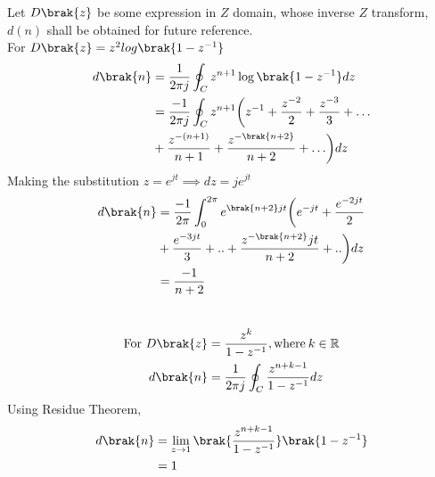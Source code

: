 Let $D\brak{z}$ be some expression in $Z$ domain, whose inverse $Z$ transform, $d(n)$ shall be obtained for future reference.\\
For $D\brak{z}= z^{2}log\brak{1-z^{-1}}$
\begin{align}
    d\brak{n}&= \frac{1}{2\pi j} \oint _C z^{n+1}\log{\brak{1-z^{-1}}}dz\\
    &=\frac{-1}{2\pi j} \oint _C z^{n+1}\biggl(z^{-1}+\frac{z^{-2}}{2} + \frac{z^{-3}}{3}+\ldots \notag\\ \;\: &+ \frac{z^{-(n+1)}}{n+1} +  \frac{z^{-\brak{n+2}}}{n+2}+ \ldots \biggr) dz\\ 
\end{align}
Making the substitution $z=e^{jt} \implies dz = je^{jt}$
\begin{align}  
    d\brak{n}&=\frac{-1}{2\pi} \int_{0}^{2\pi} e^{\brak{n+2}jt}\biggl(e^{-jt}+\frac{e^{-2jt}}{2} \notag \\&+ \frac{e^{-3jt}}{3} +.. +\frac{z^{-\brak{n+2}}jt}{n+2}+..\biggr) dz\\
    &=\frac{-1}{n+2}\label{11027_eq2}
\end{align}
\\
\begin{align}
    \notag \text{For }D\brak{z}&= \frac{z^k}{1-z^{-1}},\text{where} \: k \in \mathbb{R}\\
    d\brak{n}&=\frac{1}{2\pi j} \oint _C \frac{z^{n+k-1}}{1-z^{-1}}dz
\end{align}
Using Residue Theorem,
\begin{align}
    d\brak{n}&= \lim_{z \to 1}\brak{\frac{z^{n+k-1}}{1-z^{-1}}}\brak{{1-z^{-1}}} \\
    &= 1\label{11027_eq3}
\end{align}


